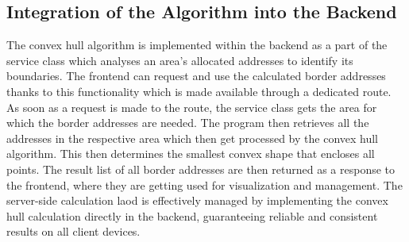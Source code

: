     \subsection{Integration of the Algorithm into the Backend}
    The convex hull algorithm is implemented within the backend as a part of the service class which analyses an area's allocated addresses to identify its boundaries. The frontend can request and use the calculated border addresses thanks to this functionality which is made available through a dedicated route. \newline
    As soon as a request is made to the route, the service class gets the area for which the border addresses are needed. The program then retrieves all the addresses in the respective area which then get processed by the convex hull algorithm. This then determines the smallest convex shape that encloses all points. The result list of all border addresses are then returned as a response to the frontend, where they are getting used for visualization and management. \newline
    The server-side calculation laod is effectively managed by implementing the convex hull calculation directly in the backend, guaranteeing reliable and consistent results on all client devices.